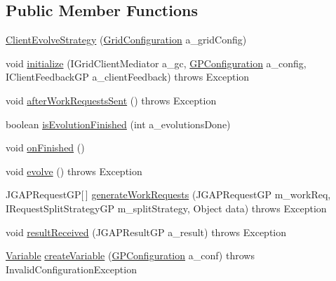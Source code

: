 \subsection*{Public Member Functions}
\begin{DoxyCompactItemize}
\item 
\hyperlink{classexamples_1_1grid_1_1math_problem_distributed_1_1_client_evolve_strategy_a0ad8d79a672c0357771f54c021b4c090}{Client\-Evolve\-Strategy} (\hyperlink{classexamples_1_1grid_1_1math_problem_distributed_1_1_grid_configuration}{Grid\-Configuration} a\-\_\-grid\-Config)
\item 
void \hyperlink{classexamples_1_1grid_1_1math_problem_distributed_1_1_client_evolve_strategy_adeea4800a3e2af53a324a306bd2c3c4c}{initialize} (I\-Grid\-Client\-Mediator a\-\_\-gc, \hyperlink{classorg_1_1jgap_1_1gp_1_1impl_1_1_g_p_configuration}{G\-P\-Configuration} a\-\_\-config, I\-Client\-Feedback\-G\-P a\-\_\-client\-Feedback)  throws Exception 
\item 
void \hyperlink{classexamples_1_1grid_1_1math_problem_distributed_1_1_client_evolve_strategy_a7b0c5a677297a08fffe823b94bbc8d9c}{after\-Work\-Requests\-Sent} ()  throws Exception 
\item 
boolean \hyperlink{classexamples_1_1grid_1_1math_problem_distributed_1_1_client_evolve_strategy_acddb8ec026e7127a7f2577365d0baaae}{is\-Evolution\-Finished} (int a\-\_\-evolutions\-Done)
\item 
void \hyperlink{classexamples_1_1grid_1_1math_problem_distributed_1_1_client_evolve_strategy_a92541f850491d647fe5607ce5fb48e0b}{on\-Finished} ()
\item 
void \hyperlink{classexamples_1_1grid_1_1math_problem_distributed_1_1_client_evolve_strategy_a821d02bb9ee9282711b6db57343e2f2f}{evolve} ()  throws Exception 
\item 
J\-G\-A\-P\-Request\-G\-P\mbox{[}$\,$\mbox{]} \hyperlink{classexamples_1_1grid_1_1math_problem_distributed_1_1_client_evolve_strategy_af33956d48611de7061d107744aa3d599}{generate\-Work\-Requests} (J\-G\-A\-P\-Request\-G\-P m\-\_\-work\-Req, I\-Request\-Split\-Strategy\-G\-P m\-\_\-split\-Strategy, Object data)  throws Exception 
\item 
void \hyperlink{classexamples_1_1grid_1_1math_problem_distributed_1_1_client_evolve_strategy_aeb5ce2077915475eb1b2a8b9debc8754}{result\-Received} (J\-G\-A\-P\-Result\-G\-P a\-\_\-result)  throws Exception 
\item 
\hyperlink{classorg_1_1jgap_1_1gp_1_1terminal_1_1_variable}{Variable} \hyperlink{classexamples_1_1grid_1_1math_problem_distributed_1_1_client_evolve_strategy_a39a213813f301a11505afb216d976330}{create\-Variable} (\hyperlink{classorg_1_1jgap_1_1gp_1_1impl_1_1_g_p_configuration}{G\-P\-Configuration} a\-\_\-conf)  throws Invalid\-Configuration\-Exception 

\end{DoxyCompactItemize}
